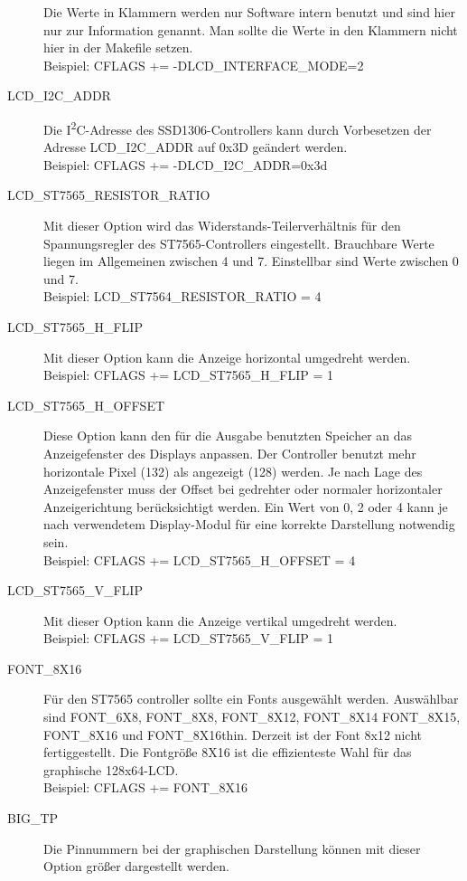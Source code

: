 \begin{description}
Die Werte in Klammern werden nur Software intern benutzt und sind hier nur zur Information genannt.
Man sollte die Werte in den Klammern nicht hier in der Makefile setzen.\\

Beispiel: CFLAGS += -DLCD\_INTERFACE\_MODE=2
 \item[LCD\_I2C\_ADDR] Die I\textsuperscript{2}C-Adresse des SSD1306-Controllers kann durch Vorbesetzen der Adresse LCD\_I2C\_ADDR
auf 0x3D geändert werden.\\
Beispiel: CFLAGS += -DLCD\_I2C\_ADDR=0x3d
  \item[LCD\_ST7565\_RESISTOR\_RATIO] Mit dieser Option wird das Widerstands-Teilerverhältnis für den
Spannungsregler des ST7565-Controllers eingestellt. Brauchbare Werte liegen im Allgemeinen zwischen 4 und 7.
Einstellbar sind Werte zwischen 0 und 7.\\
Beispiel: LCD\_ST7564\_RESISTOR\_RATIO = 4
  \item[LCD\_ST7565\_H\_FLIP] Mit dieser Option kann die Anzeige horizontal umgedreht werden.\\
Beispiel: CFLAGS += LCD\_ST7565\_H\_FLIP = 1
  \item[LCD\_ST7565\_H\_OFFSET] Diese Option kann den für die Ausgabe benutzten Speicher an das Anzeigefenster des
 Displays anpassen. Der Controller benutzt mehr horizontale Pixel (132) als angezeigt (128) werden.
 Je nach Lage des Anzeigefenster muss der Offset bei gedrehter oder normaler horizontaler Anzeigerichtung
 berücksichtigt werden.
 Ein Wert von 0, 2 oder 4 kann je nach verwendetem Display-Modul für eine korrekte Darstellung notwendig sein.\\
Beispiel: CFLAGS += LCD\_ST7565\_H\_OFFSET = 4
  \item[LCD\_ST7565\_V\_FLIP] Mit dieser Option kann die Anzeige vertikal umgedreht werden.\\
Beispiel: CFLAGS += LCD\_ST7565\_V\_FLIP = 1
  \item[FONT\_8X16] Für den ST7565 controller sollte ein Fonts ausgewählt werden.
Auswählbar  sind FONT\_6X8, FONT\_8X8, FONT\_8X12, FONT\_8X14 FONT\_8X15, FONT\_8X16 und FONT\_8X16thin.
Derzeit ist der Font 8x12 nicht fertiggestellt.
Die Fontgröße 8X16 ist die effizienteste Wahl für das graphische 128x64-LCD.\\
Beispiel: CFLAGS += FONT\_8X16
 \item[BIG\_TP] Die Pinnummern bei der graphischen Darstellung können mit dieser Option größer dargestellt werden.\\

\end{description}
